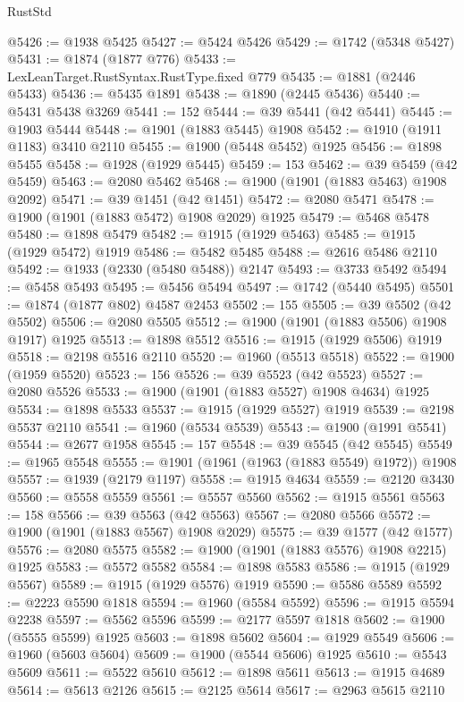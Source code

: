 \begin{lexlean}{RustStd}
\begin{coremodule}
@5426 := @1938 @5425
@5427 := @5424 @5426
@5429 := @1742 (@5348 @5427)
@5431 := @1874 (@1877 @776)
@5433 := LexLeanTarget.RustSyntax.RustType.fixed @779
@5435 := @1881 (@2446 @5433)
@5436 := @5435 @1891
@5438 := @1890 (@2445 @5436)
@5440 := @5431 @5438 @3269
@5441 := 152
@5444 := @39 @5441 (@42 @5441)
@5445 := @1903 @5444
@5448 := @1901 (@1883 @5445) @1908
@5452 := @1910 (@1911 @1183) @3410 @2110
@5455 := @1900 (@5448 @5452) @1925
@5456 := @1898 @5455
@5458 := @1928 (@1929 @5445)
@5459 := 153
@5462 := @39 @5459 (@42 @5459)
@5463 := @2080 @5462
@5468 := @1900 (@1901 (@1883 @5463) @1908 @2092)
@5471 := @39 @1451 (@42 @1451)
@5472 := @2080 @5471
@5478 := @1900 (@1901 (@1883 @5472) @1908 @2029) @1925
@5479 := @5468 @5478
@5480 := @1898 @5479
@5482 := @1915 (@1929 @5463)
@5485 := @1915 (@1929 @5472) @1919
@5486 := @5482 @5485
@5488 := @2616 @5486 @2110
@5492 := @1933 (@2330 (@5480 @5488)) @2147
@5493 := @3733 @5492
@5494 := @5458 @5493
@5495 := @5456 @5494
@5497 := @1742 (@5440 @5495)
@5501 := @1874 (@1877 @802) @4587 @2453
@5502 := 155
@5505 := @39 @5502 (@42 @5502)
@5506 := @2080 @5505
@5512 := @1900 (@1901 (@1883 @5506) @1908 @1917) @1925
@5513 := @1898 @5512
@5516 := @1915 (@1929 @5506) @1919
@5518 := @2198 @5516 @2110
@5520 := @1960 (@5513 @5518)
@5522 := @1900 (@1959 @5520)
@5523 := 156
@5526 := @39 @5523 (@42 @5523)
@5527 := @2080 @5526
@5533 := @1900 (@1901 (@1883 @5527) @1908 @4634) @1925
@5534 := @1898 @5533
@5537 := @1915 (@1929 @5527) @1919
@5539 := @2198 @5537 @2110
@5541 := @1960 (@5534 @5539)
@5543 := @1900 (@1991 @5541)
@5544 := @2677 @1958
@5545 := 157
@5548 := @39 @5545 (@42 @5545)
@5549 := @1965 @5548
@5555 := @1901 (@1961 (@1963 (@1883 @5549) @1972)) @1908
@5557 := @1939 (@2179 @1197)
@5558 := @1915 @4634
@5559 := @2120 @3430
@5560 := @5558 @5559
@5561 := @5557 @5560
@5562 := @1915 @5561
@5563 := 158
@5566 := @39 @5563 (@42 @5563)
@5567 := @2080 @5566
@5572 := @1900 (@1901 (@1883 @5567) @1908 @2029)
@5575 := @39 @1577 (@42 @1577)
@5576 := @2080 @5575
@5582 := @1900 (@1901 (@1883 @5576) @1908 @2215) @1925
@5583 := @5572 @5582
@5584 := @1898 @5583
@5586 := @1915 (@1929 @5567)
@5589 := @1915 (@1929 @5576) @1919
@5590 := @5586 @5589
@5592 := @2223 @5590 @1818
@5594 := @1960 (@5584 @5592)
@5596 := @1915 @5594 @2238
@5597 := @5562 @5596
@5599 := @2177 @5597 @1818
@5602 := @1900 (@5555 @5599) @1925
@5603 := @1898 @5602
@5604 := @1929 @5549
@5606 := @1960 (@5603 @5604)
@5609 := @1900 (@5544 @5606) @1925
@5610 := @5543 @5609
@5611 := @5522 @5610
@5612 := @1898 @5611
@5613 := @1915 @4689
@5614 := @5613 @2126
@5615 := @2125 @5614
@5617 := @2963 @5615 @2110

\end{coremodule}
\end{lexlean}

